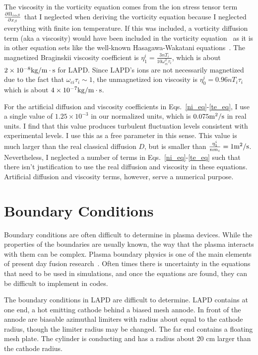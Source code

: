 The viscosity in the vorticity equation comes from the ion stress tensor term $\frac{\partial\Pi_{i \alpha \beta}}{\partial x_\beta}$ 
that I neglected when deriving the vorticity equation because I neglected everything with finite
ion temperature. If this was included, a vorticity diffusion term (aka a viscosity) would have been included in the vorticity equation~\cite{popovich2010b}
as it is in other equation sets like the well-known Hasagawa-Wakatani equations~\cite{hasegawa1983}. 
The magnetized Braginskii viscosity coefficient is $\eta_1^i = \frac{3 n T_i}{10 \omega_{ci}^2 \tau_i}$, which is about $2 \times 10^{-8} { \rm kg/m \cdot s}$ 
for LAPD. Since LAPD's ions are not necessarily magnetized due to the fact that $\omega_{ci} \tau_i \sim 1$, the unmagnetized ion viscosity is $\eta_0^i = 0.96 n T_i \tau_i$~\cite{Braginskii1965}
which is about $4 \times 10^{-7} {\rm kg/m \cdot s}$.

For the artificial diffusion and viscosity coefficients in Eqs.~\ref{ni_eq}-\ref{te_eq}, I use a single value of $1.25 \times 10^{-3}$ in our normalized units, 
which is $0.075 {\rm m^2/s}$ in real units.
I find that this value produces turbulent fluctuation levels consistent with experimental levels. 
I use this as a free parameter in this sense. This value is much larger than the real classical diffusion $D$,
but is smaller than $\frac{\eta_1^i}{n m_i} = 1 {\rm m^2/s}$. 
Nevertheless, I neglected a number of terms in Eqs.~\ref{ni_eq}-\ref{te_eq} such that there isn't justification to use the real diffusion and 
viscosity in these equations. Artificial diffusion and viscosity terms, however, serve a numerical purpose.


\section{Boundary Conditions}
\label{s_bcs}

Boundary conditions are often difficult to determine in plasma devices. While the properties of the boundaries are usually known, the way that the plasma interacts with them can be complex.
Plasma boundary physics is one of the main elements of present day fusion research~\cite{stangeby2000}. Often times there is uncertainty in the equations that need to be used in simulations,
and once the equations are found, they can be difficult to implement in codes.

The boundary conditions in LAPD are difficult to determine. LAPD contains at one end, a hot emitting cathode behind a biased mesh annode. In front of the annode are biasable azimuthal limiters
with radius about equal to the cathode radius, though the limiter radius may be changed. The far end contains a floating mesh plate. The cylinder is conducting and has a radius about 20 cm larger
than the cathode radius.

